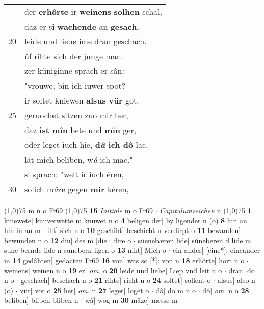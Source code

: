 \documentclass[8pt,a4paper,notitlepage]{article}
\begin{document}
\begin{table}[ht]
\begin{minipage}[t]{0.5\linewidth}
\begin{tabular}{rl}
 & der \textbf{erhôrte} ir \textbf{weinens} \textbf{solhen} schal,\\ 
 & daz er si \textbf{wachende} an \textbf{gesach}.\\ 
20 & leide und liebe ime dran geschach.\\ 
 & ûf rihte sich der junge man.\\ 
 & zer küniginne sprach er sân:\\ 
 & "vrouwe, bin ich iuwer spot?\\ 
 & ir soltet kniewen \textbf{alsus} \textbf{vür} got.\\ 
25 & geruochet sitzen zuo mir her,\\ 
 & daz \textbf{ist} \textbf{mîn} bete und \textbf{mîn} ger,\\ 
 & oder leget iuch hie, \textbf{d\textit{â} ich dô} lac.\\ 
 & lât mich belîben, w\textit{â} ich mac."\\ 
 & si sprach: "welt ir iuch êren,\\ 
30 & solich m\textit{â}ze gegen \textbf{mir} kêren,\\ 
\end{tabular}
\scriptsize
\line(1,0){75} \newline
m n o Fr69 \newline
\line(1,0){75} \newline
\textbf{15} \textit{Initiale} m o Fr69   $\cdot$ \textit{Capitulumzeichen} n  \newline
\line(1,0){75} \newline
\textbf{1} kniewete] kunverwette m knuwet n o \textbf{4} beligen der] by ligender n (o) \textbf{8} hin an] hin in an m  $\cdot$ iht] sich n o \textbf{10} geschiht] beschicht n verdirpt o \textbf{11} bewanden] bewunden n o \textbf{12} diu] des m [die]: dire o  $\cdot$ süenebæren lide] súneberen d lide m sune bernde lide n sunebern ligen o \textbf{13} niht] Mich o  $\cdot$ ein ander] [eine*]: eineander m \textbf{14} gedâhten] gedacten Fr69 \textbf{16} von] was so [*]: von n \textbf{18} erhôrte] hort n o  $\cdot$ weinens] weinen n o \textbf{19} er] \textit{om.} o \textbf{20} leide und liebe] Liep vnd leit n o  $\cdot$ dran] do n o  $\cdot$ geschach] beschach n o \textbf{21} rihte] richt n o \textbf{24} soltet] sollent o  $\cdot$ alsus] also n (o)  $\cdot$ vür] vor o \textbf{25} her] \textit{om.} n \textbf{27} leget] loget o  $\cdot$ dâ] do m n o  $\cdot$ dô] \textit{om.} n o \textbf{28} belîben] bliben bliben n  $\cdot$ wâ] wog m \textbf{30} mâze] messe m \newline
\end{minipage}
\end{table}
\end{document}
